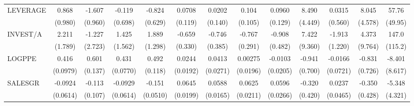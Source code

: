 {\begin{tabular}{l*{12}{c}}
LEVERAGE            &       0.868         &      -1.607         &      -0.119         &      -0.824         &      0.0708         &      0.0202         &       0.104         &      0.0960         &       8.490\sym{*}  &      0.0315         &       8.045         &       57.76         \\
                    &     (0.980)         &     (0.960)         &     (0.698)         &     (0.629)         &     (0.119)         &     (0.140)         &     (0.105)         &     (0.129)         &     (4.449)         &     (0.560)         &     (4.578)         &     (49.95)         \\
INVEST/A            &       2.211         &      -1.227         &       1.425         &       1.889         &      -0.659\sym{*}  &      -0.746\sym{*}  &      -0.767\sym{**} &      -0.908\sym{*}  &       7.422         &      -1.913         &       4.373         &       147.0         \\
                    &     (1.789)         &     (2.723)         &     (1.562)         &     (1.298)         &     (0.330)         &     (0.385)         &     (0.291)         &     (0.482)         &     (9.360)         &     (1.220)         &     (9.764)         &     (115.2)         \\
LOGPPE              &       0.416\sym{***}&       0.601\sym{***}&       0.431\sym{***}&       0.492\sym{***}&      0.0244         &      0.0413         &     0.00275         &     -0.0103         &      -0.941         &     -0.0166         &      -0.831         &      -8.401         \\
                    &    (0.0979)         &     (0.137)         &    (0.0770)         &     (0.118)         &    (0.0192)         &    (0.0271)         &    (0.0196)         &    (0.0205)         &     (0.700)         &    (0.0721)         &     (0.726)         &     (8.617)         \\
SALESGR             &     -0.0924         &      -0.113         &     -0.0929         &      -0.151\sym{**} &      0.0645\sym{***}&      0.0588\sym{***}&      0.0625\sym{**} &      0.0596\sym{**} &      -0.320         &      0.0237         &      -0.350         &      -5.348         \\
                    &    (0.0614)         &     (0.107)         &    (0.0614)         &    (0.0510)         &    (0.0199)         &    (0.0165)         &    (0.0211)         &    (0.0266)         &     (0.420)         &    (0.0465)         &     (0.428)         &     (4.321)         \\

\end{tabular}}
